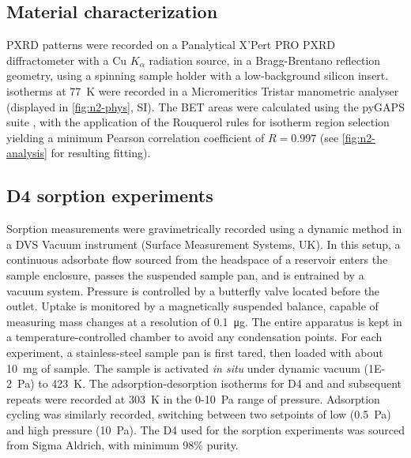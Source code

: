 \subsection{Material characterization}\label{methodology-characterization}

PXRD patterns were recorded on a Panalytical X'Pert PRO PXRD diffractometer with
a Cu \(K_{\alpha}\) radiation source, in a Bragg-Brentano reflection geometry,
using a spinning sample holder with a low-background silicon insert. 
isotherms at \SI{77}{\kelvin} were recorded in a Micromeritics Tristar
manometric analyser (displayed in \cref{fig:n2-phys}, SI). The BET areas were
calculated using the pyGAPS suite \citep{iacomiPyGAPSPythonbasedFramework2019},
with the application of the Rouquerol rules for isotherm region selection
yielding a minimum Pearson correlation coefficient of \(R=0.997\) (see
\cref{fig:n2-analysis} for resulting fitting).

\subsection{D4 sorption experiments}\label{methodology-d4sorption}

Sorption measurements were gravimetrically recorded using a dynamic method in a
DVS Vacuum instrument (Surface Measurement Systems, UK). In this setup, a
continuous adsorbate flow sourced from the headspace of a reservoir enters the
sample enclosure, passes the suspended sample pan, and is entrained by a vacuum
system. Pressure is controlled by a butterfly valve located before the outlet.
Uptake is monitored by a magnetically suspended balance, capable of measuring
mass changes at a resolution of \SI{0.1}{\micro\gram}. The entire apparatus is
kept in a temperature-controlled chamber to avoid any condensation points. For
each experiment, a stainless-steel sample pan is first tared, then loaded with
about \SI{10}{\milli\gram} of sample. The sample is activated \emph{in situ}
under dynamic vacuum (\SI{1E-2}{\pascal}) to \SI{423}{\kelvin}. The
adsorption-desorption isotherms for D4 and  and subsequent repeats were
recorded at \SI{303}{\kelvin} in the 0-\SI{10}{\pascal} range of pressure.
Adsorption cycling was similarly recorded, switching between two setpoints of
low (\SI{0.5}{\pascal}) and high pressure (\SI{10}{\pascal}). The D4 used for
the sorption experiments was sourced from Sigma Aldrich, with minimum 98\%
purity.

